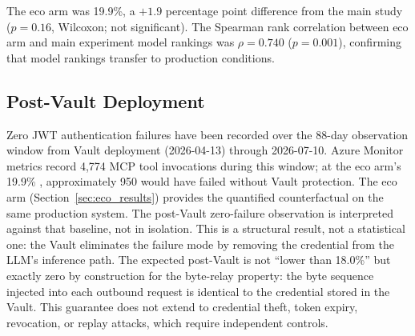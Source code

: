 The eco arm \DFR{} was 19.9\%, a $+1.9$ percentage point difference from the
main study ($p\!=\!0.16$, Wilcoxon; not
significant). The Spearman rank correlation between eco arm and main experiment
model rankings was $\rho\!=\!0.740$ ($p\!=\!0.001$), confirming that model
rankings transfer to production conditions.

\subsection{Post-Vault Deployment}\label{sec:post_vault}

Zero JWT authentication failures have been recorded over the 88-day observation
window from Vault deployment (2026-04-13) through 2026-07-10. Azure Monitor
metrics record 4{,}774 MCP tool invocations during this window; at the eco
arm's 19.9\% \DFR{}, approximately 950 would have failed without Vault
protection. The eco arm (Section~\ref{sec:eco_results}) provides the quantified
counterfactual on the same production system.
The post-Vault zero-failure observation is interpreted against that baseline,
not in isolation. This is a structural result, not a statistical one: the Vault
eliminates the failure mode by removing the credential from the LLM's inference
path. The expected post-Vault \DFR{} is not ``lower than 18.0\%'' but exactly
zero by construction for the byte-relay property: the byte sequence injected
into each outbound request is identical to the credential stored in the Vault.
This guarantee does not extend to credential theft, token expiry, revocation,
or replay attacks, which require independent controls.
